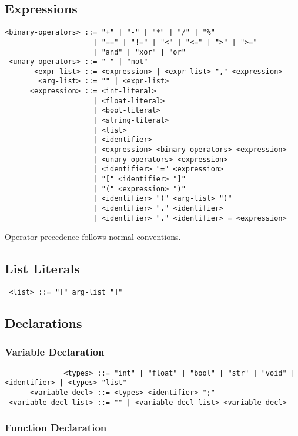 \subsection{Expressions}
\begin{verbatim}
<binary-operators> ::= "+" | "-" | "*" | "/" | "%"
                     | "==" | "!=" | "<" | "<=" | ">" | ">="
                     | "and" | "xor" | "or"
 <unary-operators> ::= "-" | "not"
       <expr-list> ::= <expression> | <expr-list> "," <expression>
        <arg-list> ::= "" | <expr-list>
      <expression> ::= <int-literal>
                     | <float-literal>
                     | <bool-literal>
                     | <string-literal>
                     | <list>
                     | <identifier>
                     | <expression> <binary-operators> <expression>
                     | <unary-operators> <expression>
                     | <identifier> "=" <expression>
                     | "[" <identifier> "]"
                     | "(" <expression> ")"
                     | <identifier> "(" <arg-list> ")"
                     | <identifier> "." <identifier>
                     | <identifier> "." <identifier> = <expression>
\end{verbatim}

Operator precedence follows normal conventions.

\subsection{List Literals}
\begin{verbatim}
 <list> ::= "[" arg-list "]"
\end{verbatim}

\subsection{Declarations}

\subsubsection{Variable Declaration}

\begin{verbatim}
              <types> ::= "int" | "float" | "bool" | "str" | "void" | <identifier> | <types> "list"
      <variable-decl> ::= <types> <identifier> ";"
 <variable-decl-list> ::= "" | <variable-decl-list> <variable-decl>
\end{verbatim}

\subsubsection{Function Declaration}


